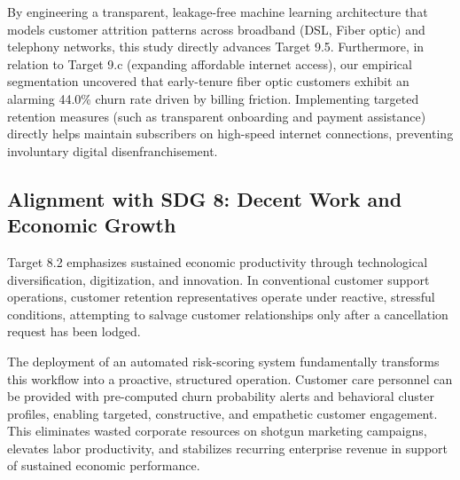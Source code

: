 By engineering a transparent, leakage-free machine learning architecture that models customer attrition patterns across broadband (DSL, Fiber optic) and telephony networks, this study directly advances Target 9.5. Furthermore, in relation to Target 9.c (expanding affordable internet access), our empirical segmentation uncovered that early-tenure fiber optic customers exhibit an alarming 44.0\% churn rate driven by billing friction. Implementing targeted retention measures (such as transparent onboarding and payment assistance) directly helps maintain subscribers on high-speed internet connections, preventing involuntary digital disenfranchisement.

\subsection{Alignment with SDG 8: Decent Work and Economic Growth}
Target 8.2 emphasizes sustained economic productivity through technological diversification, digitization, and innovation. In conventional customer support operations, customer retention representatives operate under reactive, stressful conditions, attempting to salvage customer relationships only after a cancellation request has been lodged.

The deployment of an automated risk-scoring system fundamentally transforms this workflow into a proactive, structured operation. Customer care personnel can be provided with pre-computed churn probability alerts and behavioral cluster profiles, enabling targeted, constructive, and empathetic customer engagement. This eliminates wasted corporate resources on shotgun marketing campaigns, elevates labor productivity, and stabilizes recurring enterprise revenue in support of sustained economic performance.
